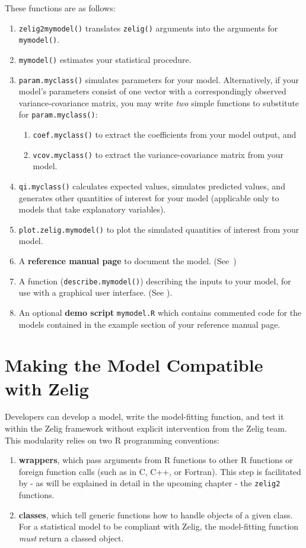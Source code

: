 These functions are as follows:  
\begin{enumerate}
\item {\tt zelig2mymodel()} translates {\tt zelig()} arguments into
the arguments for {\tt mymodel()}.
\item {\tt mymodel()} estimates your statistical procedure.
\item {\tt param.myclass()} simulates parameters for your model.
Alternatively, if your model's parameters consist of one vector with a
correspondingly observed variance-covariance matrix, you may write
\emph{two} simple functions to substitute for {\tt param.myclass()}:  
\begin{enumerate}
\item {\tt coef.myclass()} to extract the coefficients from your model
output, and
\item {\tt vcov.myclass()} to extract the variance-covariance matrix
from your model.  
\end{enumerate}
\item {\tt qi.myclass()} calculates expected values, simulates
predicted values, and generates other quantities of interest for your
model (applicable only to models that take explanatory variables).  
\item {\tt plot.zelig.mymodel()} to plot the simulated quantities of
interest from your model.  
\item A {\bf reference manual page} to document the model.
  (See~)
\item A function ({\tt describe.mymodel()}) describing the inputs to
your model, for use with a graphical user interface.  (See ).  
\item An optional {\bf demo script} {\tt mymodel.R} which contains commented code for
  the models contained in the example section of your reference manual
  page.
\end{enumerate}

\section{Making the Model Compatible with Zelig}\label{compatible}

Developers can develop a model, write the model-fitting function, and test it within the Zelig framework without explicit intervention from the Zelig team.  This modularity relies on two R programming conventions:

\begin{enumerate}
	\item{{\bf wrappers}, which pass arguments from R functions to other R functions or foreign function calls (such as in C, C++, or Fortran).  This step is facilitated by - as will be explained in detail in the upcoming chapter - the {\tt zelig2} functions.}
	\item{{\bf classes}, which tell generic functions how to handle objects of a given class.  For a statistical model to be compliant with Zelig, the model-fitting function \emph{must} return a classed object.}
\end{enumerate}

